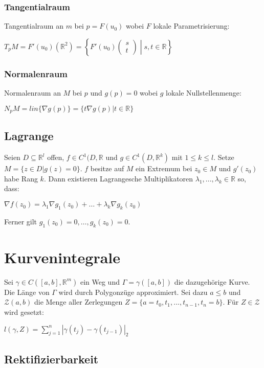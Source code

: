 \subsubsection*{Tangentialraum}

Tangentialraum an $m$ bei $p=F(u_0)$ wobei $F$ lokale Parametrisierung:

$T_p M = F'(u_0)(\mathbb{R}^2) = \left\{ F'(u_0) \begin{pmatrix} s \\ t \end{pmatrix} \middle| s, t \in \mathbb{R} \right\}$

\subsubsection*{Normalenraum}

Normalenraum an $M$ bei $p$ und $g(p)=0$ wobei $g$ lokale Nullstellenmenge:

$N_p M = lin\{\nabla g(p)\} = \{t\nabla g(p) | t \in \mathbb{R}\}$

\subsection*{Lagrange}

Seien $D \subseteq \mathbb{R}^l$ offen, $f \in C^1(D, \mathbb{R}$ und $g \in C^1(D, \mathbb{R}^k)$ mit $1 \leq k \leq l$. Setze $M=\{z\in D| g(z)=0\}$. $f$ besitze auf $M$ ein Extremum bei $z_0 \in M$ und $g'(z_0)$ habe Rang $k$. Dann existieren Lagrangesche Multiplikatoren $\lambda_1, ..., \lambda_k \in \mathbb{R}$ so, dass:

$\nabla f(z_0) = \lambda_1\nabla g_1(z_0) + \hdots + \lambda_k\nabla g_k(z_0)$

Ferner gilt $g_1(z_0) = 0, \hdots, g_k(z_0)=0$.

\section*{Kurvenintegrale}

Sei $\gamma \in C([a, b], \mathbb{R}^m)$ ein Weg und $\Gamma = \gamma([a, b])$ die dazugehörige Kurve. Die Länge von $\Gamma$ wird durch Polygonzüge approximiert. Sei dazu $a \leq b$ und $\mathcal{Z}(a, b)$ die Menge aller Zerlegungen $Z = \{a = t_0, t_1, ..., t_{n-1}, t_n = b\}$. Für $Z \in \mathcal{Z}$ wird gesetzt:

$l(\gamma, Z) = \sum_{j=1}^n |\gamma(t_j) - \gamma(t_{j-1})|_2$

\subsection*{Rektifizierbarkeit}

